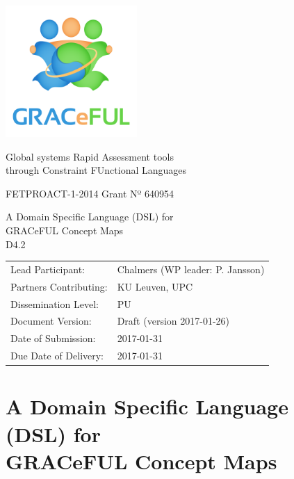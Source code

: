 \documentclass[]{article}
\author{}
\date{}
\begin{document}
\begin{center}
\includegraphics[width=5cm]{../coverpage/GRACeFULlogo.png}

\textcolor{GRACeFULblue}{Global systems Rapid Assessment tools\\
through Constraint FUnctional Languages}

\vspace{1cm}

FETPROACT-1-2014 Grant Nº 640954

\end{center}

\begin{framed}
\begin{center}
\Large
A Domain Specific Language (DSL) for \\
GRACeFUL Concept Maps\\[1ex]

D4.2\\[1ex]

\end{center}
\end{framed}

\vspace{1cm}

\noindent
\begin{tabular}{@{}ll@{}}
  Lead Participant:       & Chalmers (WP leader: P. Jansson)
\\Partners Contributing:  & KU Leuven, UPC
\\Dissemination Level:    & PU
\\Document Version:       & Draft (version 2017-01-26)
\\Date of Submission:     & 2017-01-31
\\Due Date of Delivery:   & 2017-01-31
\end{tabular}

\newpage

\section*{A Domain Specific Language (DSL) for\\GRACeFUL Concept Maps}\label{DSL4GRACeFUL}
\end{document}
